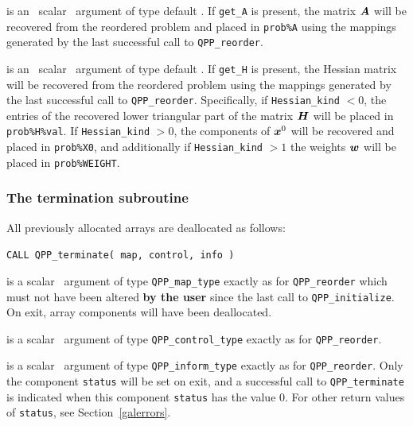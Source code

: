 \documentclass{galahad}
\newcommand{\packagename}{QPP}
\begin{document}
\begin{description}
is an \optional\ scalar \intentin\ argument of type default \logical. 
If {\tt get\_A} is present, the matrix ${\bm{A}}$
will be recovered from the reordered problem and placed in {\tt prob\%A} 
using the mappings generated by the last successful call to 
{\tt \packagename\_reorder}. 
 
is an \optional\ scalar \intentin\ argument of type default \logical. 
If {\tt get\_H} is present, the Hessian matrix will be recovered  from the
reordered problem using the mappings generated by the last successful call to 
{\tt \packagename\_reorder}. 
Specifically, if {\tt Hessian\_kind} $< 0$, the entries of the 
recovered lower triangular part of the matrix ${\bm{H}}$ will be placed in
{\tt prob\%H\%val}. If {\tt Hessian\_kind} $> 0$, the 
components of ${\bm{x}}^0$ will be recovered and placed in 
{\tt prob\%X0}, and additionally if {\tt Hessian\_kind} $> 1$ 
the weights ${\bm{w}}$ will be placed in {\tt prob\%WEIGHT}.
 
\end{description}


\subsubsection{The  termination subroutine}
All previously allocated arrays are deallocated as follows:
\vspace*{1mm}

\hspace{8mm}
{\tt CALL \packagename\_terminate( map, control, info )}

\vspace*{-3mm}
\begin{description}

 is a scalar \intentinout\ argument of type 
{\tt \packagename\_map\_type} 
exactly as for 
{\tt \packagename\_reorder}
which must not have been altered {\bf by the user} since the last call to 
{\tt \packagename\_initialize}.
On exit, array components will have been deallocated.

 is a scalar \intentin\ argument of type 
{\tt \packagename\_control\_type}
exactly as for
{\tt \packagename\_reorder}.

 is a scalar \intentout\ argument of type 
{\tt \packagename\_inform\_type}
exactly as for
{\tt \packagename\_reorder}.
Only the component {\tt status} will be set on exit, and a 
successful call to 
{\tt \packagename\_terminate}
is indicated when this  component {\tt status} has the value 0. 
For other return values of {\tt status}, see Section~\ref{galerrors}.

\end{description}
\end{document}
